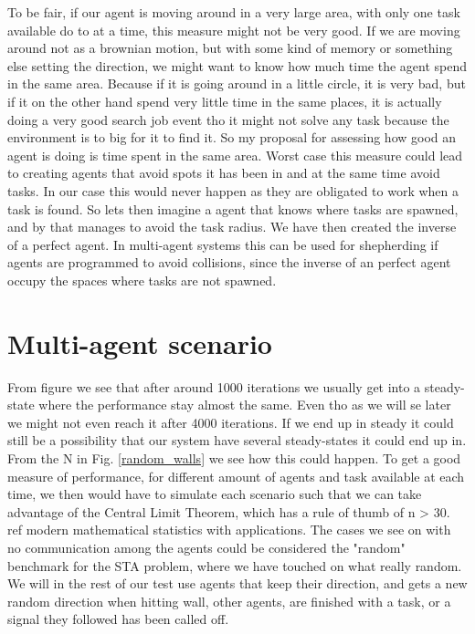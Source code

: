 \documentclass[a4paper]{article}
\begin{document}
To be fair, if our agent is moving around in a very large area, with only one task available do to at a time, this measure might not be very good. If we are moving around not as a brownian motion, but with some kind of memory or something else setting the direction, we might want to know how much time the agent spend in the same area. Because if it is going around in a little circle, it is very bad, but if it on the other hand spend very little time in the same places, it is actually doing a very good search job event tho it might not solve any task because the environment is to big for it to find it. So my proposal for assessing how good an agent is doing is time spent in the same area. Worst case this measure could lead to creating agents that avoid spots it has been in and at the same time avoid tasks. In our case this would never happen as they are obligated to work when a task is found. So lets then imagine a agent that knows where tasks are spawned, and by that manages to avoid the task radius. We have then created the inverse of a perfect agent. In multi-agent systems this can be used for shepherding if agents are programmed to avoid collisions, since the inverse of an perfect agent occupy the spaces where tasks are not spawned.




\section{Multi-agent scenario}

From figure we see that after around 1000 iterations we usually get into a steady-state where the performance stay almost the same. Even tho as we will se later we might not even reach it after 4000 iterations. If we end up in steady it could still be a possibility that our system have several steady-states it could end up in. From the N in Fig. \ref{random_walls} we see how this could happen. To get a good measure of performance, for different amount of agents and task available at each time, we then would have to simulate each scenario such that we can take advantage of the Central Limit Theorem, which has a rule of thumb of n > 30. ref modern mathematical statistics with applications. The cases we see on with no communication among the agents could be considered the "random" benchmark for the STA problem, where we have touched on what really random. We will in the rest of our test use agents that keep their direction, and gets a new random direction when hitting wall, other agents, are finished with a task, or a signal they followed has been called off.
\end{document}
